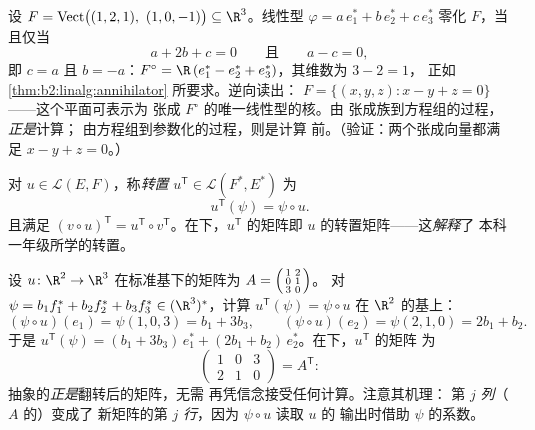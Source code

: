 \begin{example}[零化子的两个方向]\label{ex:b2:linalg:annihilatorwork}
设 $F = \operatorname{Vect}\bigl((1, 2, 1),\ (1, 0, -1)\bigr)
\subseteq \R^3$。线性型 $\varphi = a\,e_1^* + b\,e_2^* + c\,e_3^*$
零化 $F$，当且仅当
\[
a + 2b + c = 0
\qquad\text{且}\qquad
a - c = 0 ,
\]
即 $c = a$ 且 $b = -a$：$F^\circ = \R\,(e_1^* - e_2^* +
e_3^*)$，其维数为 $3 - 2 = 1$，
正如 \cref{thm:b2:linalg:annihilator} 所要求。逆向读出：
$F = \{(x, y, z) : x - y + z = 0\}$——这个平面可表示为
张成 $F^\circ$ 的唯一线性型的核。由
张成族到方程组的过程，\emph{正是}计算；
由方程组到参数化的过程，则是计算
前。（验证：两个张成向量都满足 $x - y +
z = 0$。）
\end{example}

\begin{definition}[转置映射]\label{def:b2:linalg:transpose}
对 $u \in \mathcal{L}(E, F)$，称\emph{转置} $u^{\mathsf T} \in \mathcal{L}(F^*, E^*)$ 为
\[
u^{\mathsf T}(\psi) = \psi \circ u .
\]
且满足 $(v \circ u)^{\mathsf T} = u^{\mathsf T} \circ v^{\mathsf
T}$。在下，$u^{\mathsf T}$ 的矩阵即
$u$ 的转置矩阵——这\emph{解释}了
本科一年级所学的转置。
\end{definition}

\begin{example}[转置，逐项计算]\label{ex:b2:linalg:transposework}
设 $u \colon \R^2 \to \R^3$ 在标准基下的矩阵为 $A =
\begin{psmallmatrix} 1 & 2\\ 0 & 1\\ 3 & 0\end{psmallmatrix}$。
对 $\psi = b_1f_1^* + b_2f_2^* + b_3f_3^*
\in (\R^3)^*$，计算 $u^{\mathsf T}(\psi) = \psi \circ u$ 在
$\R^2$ 的基上：
\[
(\psi \circ u)(e_1) = \psi(1, 0, 3) = b_1 + 3b_3,
\qquad
(\psi \circ u)(e_2) = \psi(2, 1, 0) = 2b_1 + b_2 .
\]
于是 $u^{\mathsf T}(\psi) = (b_1 + 3b_3)\,e_1^* + (2b_1 +
b_2)\,e_2^*$。在下，$u^{\mathsf T}$ 的矩阵
为
\[
\begin{pmatrix} 1 & 0 & 3\\ 2 & 1 & 0\end{pmatrix}
= A^{\mathsf T} :
\]
抽象的\emph{正是}翻转后的矩阵，无需
再凭信念接受任何计算。注意其机理：
第 $j$ \emph{列}（$A$ 的）变成了
新矩阵的第 $j$ \emph{行}，因为 $\psi \circ u$ 读取 $u$ 的
输出时借助 $\psi$ 的系数。
\end{example}

